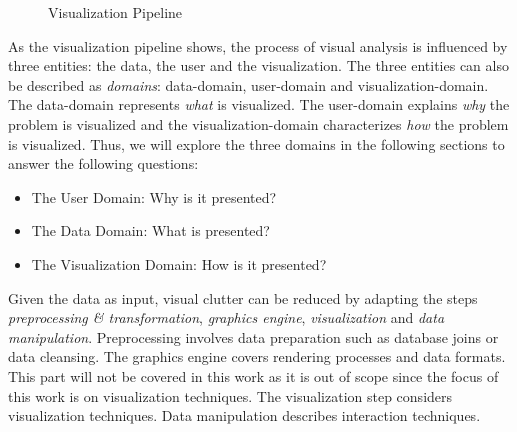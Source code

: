 \begin{figure}[H]
    \centering
    \caption[Visualization Pipeline]{Visualization Pipeline}
    \label{fig:vispipeline}
\end{figure}

As the visualization pipeline shows, the process of visual analysis is influenced by three entities: the data, the user and the visualization.
The three entities can also be described as \textit{domains}: data-domain, user-domain and visualization-domain. The data-domain represents \textit{what} is visualized. The user-domain explains \textit{why} the problem is visualized and the visualization-domain characterizes \textit{how} the problem is visualized. Thus, we will explore the three domains in the following sections to answer the following questions: 

\begin{itemize}
    \item The User Domain: Why is it presented?
    \item The Data Domain: What is presented?
    \item The Visualization Domain: How is it presented?
\end{itemize}

Given the data as input, visual clutter can be reduced by adapting the steps \textit{preprocessing \& transformation}, \textit{graphics engine}, \textit{visualization} and \textit{data manipulation}. Preprocessing involves data preparation such as database joins or data cleansing. The graphics engine covers rendering processes and data formats. This part will not be covered in this work as it is out of scope since the focus of this work is on visualization techniques. The visualization step considers visualization techniques. Data manipulation describes interaction techniques.  

